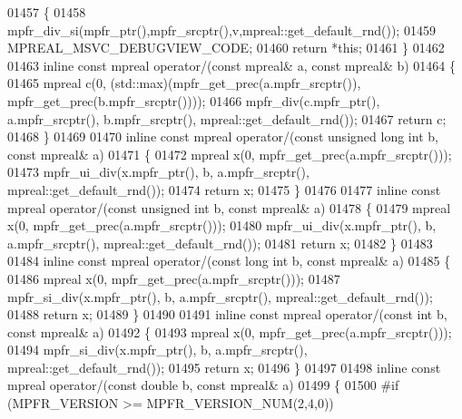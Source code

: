 \begin{DoxyCode}
01457 \{
01458     mpfr\_div\_si(mpfr\_ptr(),mpfr\_srcptr(),v,mpreal::get\_default\_rnd());
01459     MPREAL\_MSVC\_DEBUGVIEW\_CODE;
01460     \textcolor{keywordflow}{return} *\textcolor{keyword}{this};
01461 \}
01462 
01463 \textcolor{keyword}{inline} \textcolor{keyword}{const} mpreal operator/(\textcolor{keyword}{const} mpreal& a, \textcolor{keyword}{const} mpreal& b)
01464 \{
01465   mpreal c(0, (std::max)(mpfr\_get\_prec(a.mpfr\_srcptr()), mpfr\_get\_prec(b.mpfr\_srcptr())));
01466   mpfr\_div(c.mpfr\_ptr(), a.mpfr\_srcptr(), b.mpfr\_srcptr(), mpreal::get\_default\_rnd());
01467   \textcolor{keywordflow}{return} c;
01468 \}
01469 
01470 \textcolor{keyword}{inline} \textcolor{keyword}{const} mpreal operator/(\textcolor{keyword}{const} \textcolor{keywordtype}{unsigned} \textcolor{keywordtype}{long} \textcolor{keywordtype}{int} b, \textcolor{keyword}{const} mpreal& a)
01471 \{
01472     mpreal x(0, mpfr\_get\_prec(a.mpfr\_srcptr()));
01473     mpfr\_ui\_div(x.mpfr\_ptr(), b, a.mpfr\_srcptr(), mpreal::get\_default\_rnd());
01474     \textcolor{keywordflow}{return} x;
01475 \}
01476 
01477 \textcolor{keyword}{inline} \textcolor{keyword}{const} mpreal operator/(\textcolor{keyword}{const} \textcolor{keywordtype}{unsigned} \textcolor{keywordtype}{int} b, \textcolor{keyword}{const} mpreal& a)
01478 \{
01479     mpreal x(0, mpfr\_get\_prec(a.mpfr\_srcptr()));
01480     mpfr\_ui\_div(x.mpfr\_ptr(), b, a.mpfr\_srcptr(), mpreal::get\_default\_rnd());
01481     \textcolor{keywordflow}{return} x;
01482 \}
01483 
01484 \textcolor{keyword}{inline} \textcolor{keyword}{const} mpreal operator/(\textcolor{keyword}{const} \textcolor{keywordtype}{long} \textcolor{keywordtype}{int} b, \textcolor{keyword}{const} mpreal& a)
01485 \{
01486     mpreal x(0, mpfr\_get\_prec(a.mpfr\_srcptr()));
01487     mpfr\_si\_div(x.mpfr\_ptr(), b, a.mpfr\_srcptr(), mpreal::get\_default\_rnd());
01488     \textcolor{keywordflow}{return} x;
01489 \}
01490 
01491 \textcolor{keyword}{inline} \textcolor{keyword}{const} mpreal operator/(\textcolor{keyword}{const} \textcolor{keywordtype}{int} b, \textcolor{keyword}{const} mpreal& a)
01492 \{
01493     mpreal x(0, mpfr\_get\_prec(a.mpfr\_srcptr()));
01494     mpfr\_si\_div(x.mpfr\_ptr(), b, a.mpfr\_srcptr(), mpreal::get\_default\_rnd());
01495     \textcolor{keywordflow}{return} x;
01496 \}
01497 
01498 \textcolor{keyword}{inline} \textcolor{keyword}{const} mpreal operator/(\textcolor{keyword}{const} \textcolor{keywordtype}{double}  b, \textcolor{keyword}{const} mpreal& a)
01499 \{
01500 \textcolor{preprocessor}{#if (MPFR\_VERSION >= MPFR\_VERSION\_NUM(2,4,0))}

\end{DoxyCode}

